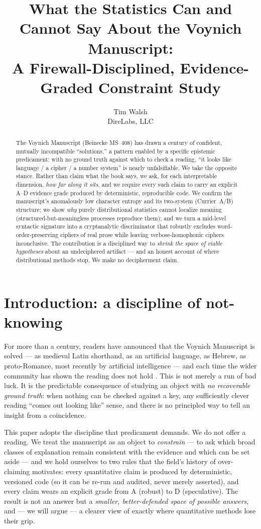 \documentclass[11pt]{article}
\title{\textbf{What the Statistics Can and Cannot Say About the Voynich Manuscript:\\
A Firewall-Disciplined, Evidence-Graded Constraint Study}}
\author{Tim Walsh \\ \small DireLabs, LLC}
\date{}
\begin{document}
\maketitle

\begin{abstract}
\noindent The Voynich Manuscript (Beinecke MS~408) has drawn a century of confident, mutually
incompatible ``solutions,'' a pattern enabled by a specific epistemic predicament: with no
ground truth against which to check a reading, ``it looks like language / a cipher / a number
system'' is nearly unfalsifiable. We take the opposite stance. Rather than claim what the book
says, we ask, for each interpretable dimension, \emph{how far along it sits}, and we require every
such claim to carry an explicit A--D evidence grade produced by deterministic, reproducible code.
We confirm the manuscript's anomalously low character entropy and its two-system (Currier~A/B)
structure; we show \emph{why} purely distributional statistics cannot localize meaning
(structured-but-meaningless processes reproduce them); and we turn a mid-level syntactic signature
into a cryptanalytic discriminator that robustly excludes word-order-preserving ciphers of real
prose while leaving verbose-homophonic ciphers inconclusive. The contribution is a disciplined way
to \emph{shrink the space of viable hypotheses} about an undeciphered artifact --- and an honest
account of where distributional methods stop. We make no decipherment claim.
\end{abstract}

\section{Introduction: a discipline of not-knowing}
For more than a century, readers have announced that the Voynich Manuscript is solved --- as
medieval Latin shorthand, as an artificial language, as Hebrew, as proto-Romance, most recently by
artificial intelligence --- and each time the wider community has shown the reading does not hold
\citep{bowern2021linguistics}. This is not merely a run of bad luck. It is the predictable
consequence of studying an object with \emph{no recoverable ground truth}: when nothing can be
checked against a key, any sufficiently clever reading ``comes out looking like'' sense, and there
is no principled way to tell an insight from a coincidence.

This paper adopts the discipline that predicament demands. We do not offer a reading. We treat the
manuscript as an object to \emph{constrain} --- to ask which broad classes of explanation remain
consistent with the evidence and which can be set aside --- and we hold ourselves to two rules
that the field's history of over-claiming motivates: every quantitative claim is produced by
deterministic, versioned code (so it can be re-run and audited, never merely asserted), and every
claim wears an explicit grade from A (robust) to D (speculative). The result is not an answer but
a \emph{smaller, better-defended space of possible answers}, and --- we will argue --- a clearer
view of exactly where quantitative methods lose their grip.
\end{document}
